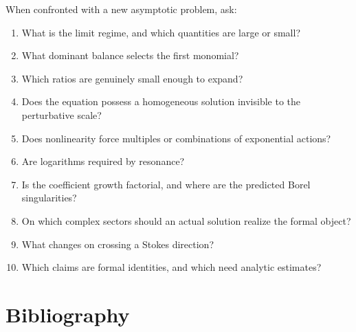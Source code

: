 \documentclass[11pt,openany]{book}
\theoremstyle{plain}
\theoremstyle{definition}
\theoremstyle{remark}
\begin{document}
When confronted with a new asymptotic problem, ask:
\begin{enumerate}
 \item What is the limit regime, and which quantities are large or small?
 \item What dominant balance selects the first monomial?
 \item Which ratios are genuinely small enough to expand?
 \item Does the equation possess a homogeneous solution invisible to the perturbative scale?
 \item Does nonlinearity force multiples or combinations of exponential actions?
 \item Are logarithms required by resonance?
 \item Is the coefficient growth factorial, and where are the predicted Borel singularities?
 \item On which complex sectors should an actual solution realize the formal object?
 \item What changes on crossing a Stokes direction?
 \item Which claims are formal identities, and which need analytic estimates?
\end{enumerate}

\backmatter

\chapter*{Bibliography}
\end{document}
